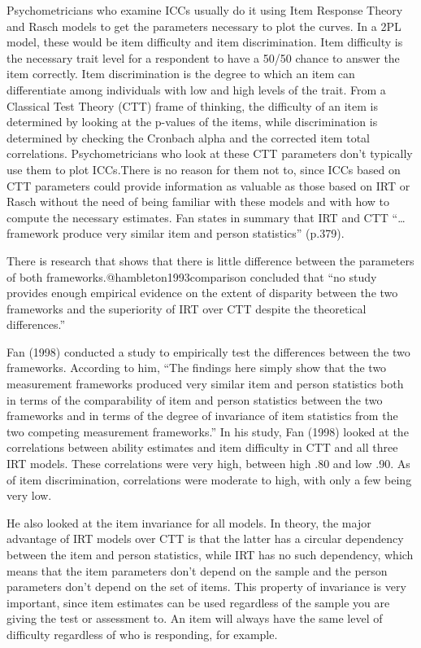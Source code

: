 \documentclass[
  english,
  man,floatsintext]{apa6}
\begin{document}
Psychometricians who examine ICCs usually do it using Item Response Theory and Rasch models to get the parameters necessary to plot the curves. In a 2PL model, these would be item difficulty and item discrimination. Item difficulty is the necessary trait level for a respondent to have a 50/50 chance to answer the item correctly. Item discrimination is the degree to which an item can differentiate among individuals with low and high levels of the trait. From a Classical Test Theory (CTT) frame of thinking, the difficulty of an item is determined by looking at the p-values of the items, while discrimination is determined by checking the Cronbach alpha and the corrected item total correlations. Psychometricians who look at these CTT parameters don't typically use them to plot ICCs.There is no reason for them not to, since ICCs based on CTT parameters could provide information as valuable as those based on IRT or Rasch without the need of being familiar with these models and with how to compute the necessary estimates. Fan states in summary that IRT and CTT ``\ldots{} framework produce very similar item and person statistics'' (p.379).

There is research that shows that there is little difference between the parameters of both frameworks.@hambleton1993comparison concluded that ``no study provides enough empirical evidence on the extent of disparity between the two frameworks and the superiority of IRT over CTT despite the theoretical differences.''

Fan (1998) conducted a study to empirically test the differences between the two frameworks. According to him, ``The findings here simply show that the two measurement frameworks produced very similar item and person statistics both in terms of the comparability of item and person statistics between the two frameworks and in terms of the degree of invariance of item statistics from the two competing measurement frameworks.'' In his study, Fan (1998) looked at the correlations between ability estimates and item difficulty in CTT and all three IRT models. These correlations were very high, between high .80 and low .90. As of item discrimination, correlations were moderate to high, with only a few being very low.

He also looked at the item invariance for all models. In theory, the major advantage of IRT models over CTT is that the latter has a circular dependency between the item and person statistics, while IRT has no such dependency, which means that the item parameters don't depend on the sample and the person parameters don't depend on the set of items. This property of invariance is very important, since item estimates can be used regardless of the sample you are giving the test or assessment to. An item will always have the same level of difficulty regardless of who is responding, for example.
\end{document}
